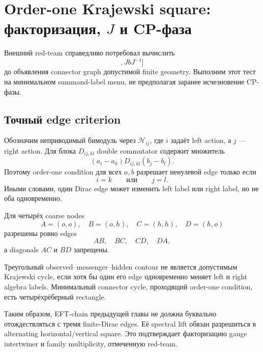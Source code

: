 \chapter{Order-one Krajewski square: факторизация, \texorpdfstring{\(J\)}{J} и CP-фаза}

Внешний red-team справедливо потребовал вычислить
\begin{equation}
 [[D_F,a],JbJ^{-1}]
\end{equation}
до объявления connector graph допустимой finite geometry. Выполним этот
тест на минимальном summand-label menu, не предполагая заранее исчезновение
CP-фазы.

\section{Точный edge criterion}

Обозначим неприводимый бимодуль через
\(\mathcal H_{ij}\), где \(i\) задаёт left action, а \(j\) --- right action.
Для блока \(D_{ij,kl}\) double commutator содержит множитель
\begin{equation}
 (a_i-a_k)D_{ij,kl}(b_j-b_l).
\end{equation}
Поэтому order-one condition для всех \(a,b\) разрешает ненулевой edge только
если
\begin{equation}
 i=k
 \qquad\text{или}\qquad
 j=l.
\end{equation}
Иными словами, один Dirac edge может изменить left label или right label,
но не оба одновременно.

Для четырёх coarse nodes
\begin{equation}
 A=(o,o),\quad B=(o,h),\quad C=(h,h),\quad D=(h,o)
\end{equation}
разрешены ровно edges
\begin{equation}
 AB,\quad BC,\quad CD,\quad DA,
\end{equation}
а diagonals \(AC\) и \(BD\) запрещены.

\begin{theorem}
Треугольный observed--messenger--hidden contour не является допустимым
Krajewski cycle, если хотя бы один его edge одновременно меняет left и right
algebra labels. Минимальный connector cycle, проходящий order-one condition,
есть четырёхрёберный rectangle.
\end{theorem}

Таким образом, EFT-chain предыдущей главы не должна буквально отождествляться
с тремя finite-Dirac edges. Её spectral lift обязан разрешиться в alternating
horizontal/vertical square. Это подтверждает факторизацию gauge intertwiner
и family multiplicity, отмеченную red-team.

